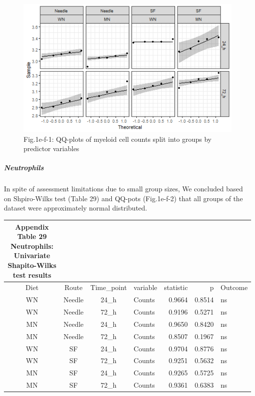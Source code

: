 \documentclass[
  12pt,
  letterpaper,
]{article}
\begin{document}
\begin{figure}[H]

{\centering \includegraphics[width=0.95\linewidth,]{Statistics_report_files/figure-latex/qq-plot-figure-1e-f-myeloid-cells-1} 

}

\caption{Fig.1e-f-1: QQ-plots of myeloid cell counts split into groups by predictor variables}\label{fig:qq-plot-figure-1e-f-myeloid-cells}
\end{figure}

\subparagraph{Neutrophils}\label{neutrophils-2}

In spite of assessment limitations due to small group sizes, We concluded based on Shpiro-Wilks test (Table 29) and QQ-pots (Fig.1e-f-2) that all groups of the dataset were approximately normal distributed.

\begin{longtable}{ccclrrl}
\caption*{
{\large \textbf{Appendix Table 29}} \\ 
{\small \textbf{Neutrophils: Univariate Shapito-Wilks test results}}
} \\ 
\toprule
Diet & Route & Time\_point & variable & statistic & p & Outcome \\ 
\midrule\addlinespace[2.5pt]
WN & Needle & 24\_h & Counts & 0.9664 & 0.8514 & ns \\ 
WN & Needle & 72\_h & Counts & 0.9196 & 0.5271 & ns \\ 
MN & Needle & 24\_h & Counts & 0.9650 & 0.8420 & ns \\ 
MN & Needle & 72\_h & Counts & 0.8507 & 0.1967 & ns \\ 
WN & SF & 24\_h & Counts & 0.9704 & 0.8776 & ns \\ 
WN & SF & 72\_h & Counts & 0.9251 & 0.5632 & ns \\ 
MN & SF & 24\_h & Counts & 0.9265 & 0.5725 & ns \\ 
MN & SF & 72\_h & Counts & 0.9361 & 0.6383 & ns \\ 
\bottomrule
\end{longtable}
\end{document}
